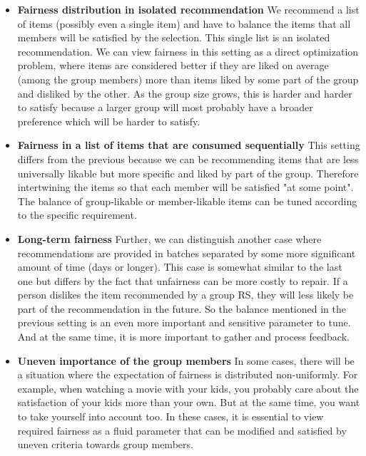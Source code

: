 \begin{itemize}
    \item \textbf{Fairness distribution in isolated recommendation}\newline
    We recommend a list of items (possibly even a single item) and have to balance the items that all members will be satisfied by the selection. This single list is an isolated recommendation. We can view fairness in this setting as a direct optimization problem, where items are considered better if they are liked on average (among the group members) more than items liked by some part of the group and disliked by the other. As the group size grows, this is harder and harder to satisfy because a larger group will most probably have a broader preference which will be harder to satisfy.
    
    \item \textbf{Fairness in a list of items that are consumed sequentially}
    This setting differs from the previous because we can be recommending items that are less universally likable but more specific and liked by part of the group. Therefore intertwining the items so that each member will be satisfied "at some point". The balance of group-likable or member-likable items can be tuned according to the specific requirement.
    
    \item \textbf{Long-term fairness}\newline
    Further, we can distinguish another case where recommendations are provided in batches separated by some more significant amount of time (days or longer). This case is somewhat similar to the last one but differs by the fact that unfairness can be more costly to repair. If a person dislikes the item recommended by a group RS, they will less likely be part of the recommendation in the future. So the balance mentioned in the previous setting is an even more important and sensitive parameter to tune. And at the same time, it is more important to gather and process feedback.
    
    \item \textbf{Uneven importance of the group members}
    In some cases, there will be a situation where the expectation of fairness is distributed non-uniformly. For example, when watching a movie with your kids, you probably care about the satisfaction of your kids more than your own. But at the same time, you want to take yourself into account too. In these cases, it is essential to view required fairness as a fluid parameter that can be modified and satisfied by uneven criteria towards group members.
    
    
\end{itemize}

